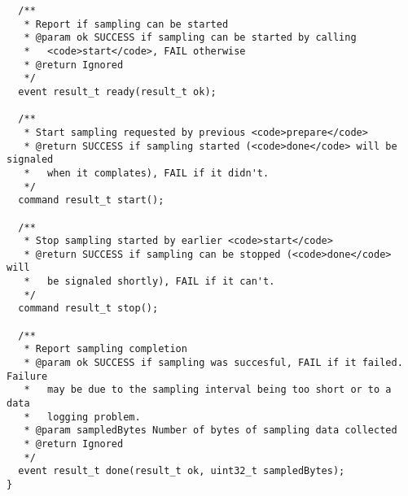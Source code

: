 \documentclass{article}
\begin{document}
\begin{verbatim}
  /**
   * Report if sampling can be started
   * @param ok SUCCESS if sampling can be started by calling 
   *   <code>start</code>, FAIL otherwise
   * @return Ignored
   */
  event result_t ready(result_t ok);

  /** 
   * Start sampling requested by previous <code>prepare</code>
   * @return SUCCESS if sampling started (<code>done</code> will be signaled
   *   when it complates), FAIL if it didn't.
   */
  command result_t start();

  /** 
   * Stop sampling started by earlier <code>start</code>
   * @return SUCCESS if sampling can be stopped (<code>done</code> will 
   *   be signaled shortly), FAIL if it can't.
   */
  command result_t stop();

  /**
   * Report sampling completion
   * @param ok SUCCESS if sampling was succesful, FAIL if it failed. Failure
   *   may be due to the sampling interval being too short or to a data
   *   logging problem.
   * @param sampledBytes Number of bytes of sampling data collected
   * @return Ignored
   */
  event result_t done(result_t ok, uint32_t sampledBytes);
}
\end{verbatim}
\end{document}
